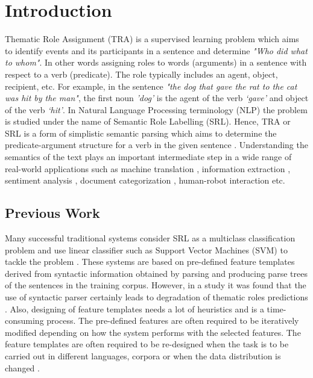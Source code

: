 \chapter{Introduction}\label{introduction}

Thematic Role Assignment (TRA) is a supervised learning problem which aims to identify events and its participants in a sentence and determine \textit{"Who did what to whom"}. In other words assigning roles to words (arguments) in a sentence with respect to a verb (predicate). The role typically includes an agent, object, recipient, etc. For example, in the sentence \textit{"the dog that gave the rat to the cat was hit by the man"}, the first noun \textit{'dog'} is the agent of the verb \textit{`gave'} and object of the verb \textit{`hit'}. In Natural Language Processing terminology (NLP) the problem is studied under the name of Semantic Role Labelling (SRL). Hence, TRA or SRL is a form of simplistic semantic parsing which aims to determine the predicate-argument structure for a verb in the given sentence \cite{end-to-end}. Understanding the semantics of the text plays an important intermediate step in a wide range of real-world applications such as machine translation \cite{srl:machine_translation}, information extraction \cite{srl:info_extraction:hri}, sentiment analysis \cite{srl:sentiment:wang}, document categorization \cite{srl:text_categorization:persson}, human-robot interaction \cite{tra:xavier_hri,srl:info_extraction:hri} etc.

\section{Previous Work}

Many successful traditional systems consider SRL as a multiclass classification problem and use linear classifier such as Support Vector Machines (SVM) to tackle the problem \cite{Koomen:2005,srl:pradhan:2004,pradhan:2005}. These systems are based on pre-defined feature templates derived from syntactic information obtained by parsing and producing parse trees of the sentences in the training corpus. However, in a study it was found that the use of syntactic parser certainly leads to degradation of thematic roles predictions \cite{pradhan:2005}. Also, designing of feature templates needs a lot of heuristics and is a time-consuming process. The pre-defined features are often required to be iteratively modified depending on how the system performs with the selected features. The feature templates are often required to be re-designed when the task is to be carried out in different languages, corpora or when the data distribution is changed \cite{end-to-end}.

